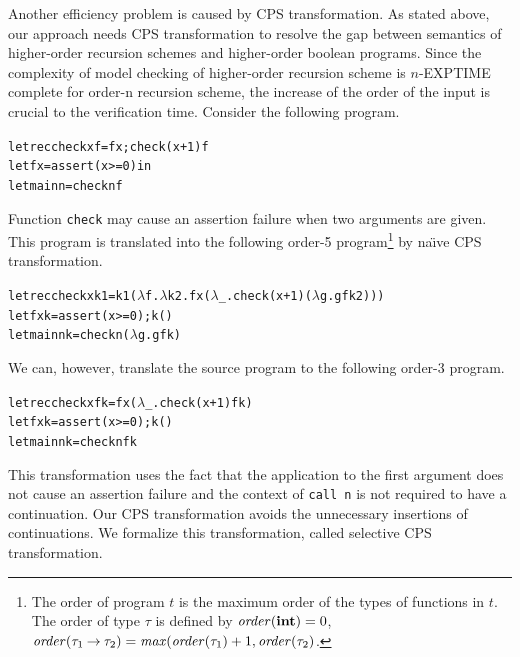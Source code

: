 Another efficiency problem is caused by CPS transformation.
As stated above, our approach needs CPS transformation to resolve the gap between
semantics of higher-order recursion schemes and higher-order boolean
programs.  Since the complexity of model checking of higher-order
recursion scheme is $n$-EXPTIME complete for order-n
recursion scheme, the increase of the order of the input is crucial to
the verification time.  Consider the following program.
\begin{alltt}
let rec check x f = f x; check (x+1) f
let f x = assert (x >= 0) in
let main n = check n f
\end{alltt}
Function \texttt{check} may cause an assertion failure when two arguments are
given.  This program is translated into the following order-5
program\footnote{The order of program $t$ is the maximum order of the
types of functions in $t$.  The order of type $\tau$ is defined by
$\mathit{order}(\mathbf{int})=0$, $\mathit{order}({\tau_1}\mathbin{\rightarrow}{\tau_2}) =
\mathit{max}(\mathit{order}(\tau_1)+1, \mathit{order}(\tau_2)$.}  by
na\"{\i}ve CPS transformation.
\begin{alltt}
let rec check x k1 = k1 (\(\lambda\)f.\(\lambda\)k2.f x (\(\lambda\)_.check (x+1) (\(\lambda\)g.g f k2)))
let f x k = assert (x >= 0); k ()
let main n k = check n (\(\lambda\)g. g f k)
\end{alltt}
We can, however, translate the source program to the following order-3 program.
\begin{alltt}
let rec check x f k = f x (\(\lambda\)_.check (x+1) f k)
let f x k = assert (x >= 0); k ()
let main n k = check n f k
\end{alltt}
This transformation uses the fact that the application to the first
argument does not cause an assertion failure and the context of
\texttt{call n} is not required to have a continuation.  Our CPS
transformation avoids the unnecessary insertions of continuations.  We
formalize this transformation, called selective CPS transformation.

